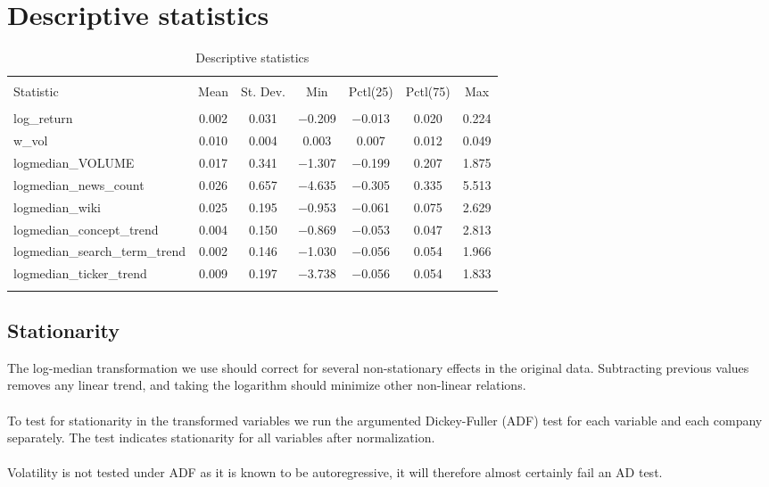 \section{Descriptive statistics}
\begin{table}[!htbp] \centering 
  \caption{Descriptive statistics} 
  \label{tab:desc_stat} 
\begin{tabular}{@{\extracolsep{5pt}}lcccccc} 
\\[-1.8ex]\hline 
\hline \\[-1.8ex] 
Statistic & \multicolumn{1}{c}{Mean} & \multicolumn{1}{c}{St. Dev.} & \multicolumn{1}{c}{Min} & \multicolumn{1}{c}{Pctl(25)} & \multicolumn{1}{c}{Pctl(75)} & \multicolumn{1}{c}{Max} \\ 
\hline \\[-1.8ex] 
log\_return & 0.002 & 0.031 & $-$0.209 & $-$0.013 & 0.020 & 0.224 \\ 
w\_vol & 0.010 & 0.004 & 0.003 & 0.007 & 0.012 & 0.049 \\ 
logmedian\_VOLUME & 0.017 & 0.341 & $-$1.307 & $-$0.199 & 0.207 & 1.875 \\ 
logmedian\_news\_count & 0.026 & 0.657 & $-$4.635 & $-$0.305 & 0.335 & 5.513 \\ 
logmedian\_wiki & 0.025 & 0.195 & $-$0.953 & $-$0.061 & 0.075 & 2.629 \\ 
logmedian\_concept\_trend & 0.004 & 0.150 & $-$0.869 & $-$0.053 & 0.047 & 2.813 \\ 
logmedian\_search\_term\_trend & 0.002 & 0.146 & $-$1.030 & $-$0.056 & 0.054 & 1.966 \\ 
logmedian\_ticker\_trend & 0.009 & 0.197 & $-$3.738 & $-$0.056 & 0.054 & 1.833 \\ 
\hline \\[-1.8ex] 
\end{tabular} 
\end{table} 

\clearpage

\subsection*{Stationarity}

The log-median transformation we use should correct for several non-stationary effects in the original data. 
Subtracting previous values removes any linear trend, and taking the logarithm should minimize other non-linear relations. 
\\\\
To test for stationarity in the transformed variables we run the argumented Dickey-Fuller (ADF) test for each variable and each company separately. The test indicates stationarity for all variables after normalization. 
\\\\
Volatility is not tested under ADF as it is known to be autoregressive, it will therefore almost certainly fail an AD test. 










